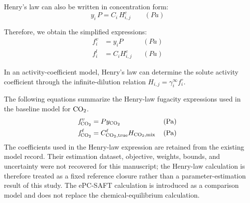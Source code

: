                 Henry's law can also be written in concentration form:
                \begin{equation}
                    y_i \, P = C_i \, H^{c}_{i,j}
                    \qquad \left(\unit{Pa}\right)
                \end{equation}

                Therefore, we obtain the simplified expressions:
                \begin{align}
                    f_i^v &= y_i P
                    && \left(\unit{Pa}\right)\\
                    f_i^l &= C_i H^{c}_{i,j}
                    && \left(\unit{Pa}\right)
                \end{align}

                In an activity-coefficient model, Henry's law can determine the solute activity coefficient through the infinite-dilution relation $H_{i,j} = \gamma^{\infty}_i f^{\circ}_i$.

                The following equations summarize the Henry-law fugacity expressions used in the baseline model for $\COtwo$.
                \begin{align}
                    \textit{f}^{\:\vap}_{ \COtwo} &= P y_{\COtwo} && \left(\unit{Pa} \right)\\
                    \textit{f}^{\:\liq}_{ \COtwo} &= C^{\liq}_{ \COtwo, \text{true}} H_{\COtwo,\text{mix}} &&\left(\unit{Pa} \right) \label{eq:ideal}
                \end{align}
                The coefficients used in the Henry-law expression are retained from the existing model record. Their estimation dataset, objective, weights, bounds, and uncertainty were not recovered for this manuscript; the Henry-law calculation is therefore treated as a fixed reference closure rather than a parameter-estimation result of this study. The ePC-SAFT calculation is introduced as a comparison model and does not replace the chemical-equilibrium calculation.

